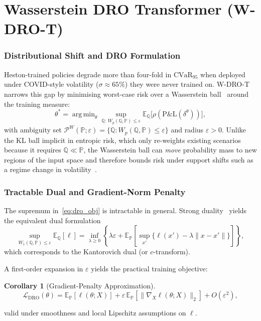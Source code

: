 \documentclass[11pt,oneside]{report}
\newcommand{\cvar}{\mathrm{CVaR}}
\newcommand{\PP}{\mathbb{P}}
\newcommand{\QQ}{\mathbb{Q}}
\newcommand{\E}{\mathbb{E}}
\newcommand{\argmin}{\mathop{\mathrm{arg\,min}}}
\newtheorem{corollary}{Corollary}[chapter]
\begin{document}
\section{Wasserstein DRO Transformer (W-DRO-T)}
\label{sec:wdrot}

\subsubsection{Distributional Shift and DRO Formulation}

Heston-trained policies degrade more than four-fold in $\cvar_{95}$ when deployed under COVID-style volatility ($\sigma\approx65\%$) they were never trained on. W-DRO-T narrows this gap by minimising worst-case risk over a Wasserstein ball~\citep{esfahani2018data} around the training measure:
\begin{equation}
\theta^* = \argmin_\theta \sup_{\QQ:\,W_p(\QQ,\PP)\le\varepsilon}
\E_\QQ\bigl[\rho(\mathrm{P\&L}(\delta^\theta))\bigr],
\label{eq:dro_obj}
\end{equation}
with ambiguity set $\mathcal{P}^W(\PP;\varepsilon) = \{\QQ:W_p(\QQ,\PP)\le\varepsilon\}$ and radius $\varepsilon>0$. Unlike the KL ball implicit in entropic risk, which only re-weights existing scenarios because it requires $\QQ\ll\PP$, the Wasserstein ball can \emph{move} probability mass to new regions of the input space and therefore bounds risk under support shifts such as a regime change in volatility~\citep{esfahani2018data}.

\subsubsection{Tractable Dual and Gradient-Norm Penalty}

The supremum in~\eqref{eq:dro_obj} is intractable in general. Strong duality~\citep{esfahani2018data,blanchet2019quantifying} yields the equivalent dual formulation
\begin{equation}
\sup_{W_1(\QQ,\PP)\le\varepsilon} \E_\QQ[\ell]
=
\inf_{\lambda\ge0}
\left\{
\lambda\varepsilon + \E_\PP\!\left[
\sup_{x'}\{\ell(x') - \lambda\|x-x'\|\}
\right]
\right\},
\end{equation}
which corresponds to the Kantorovich dual (or $c$-transform).

A first-order expansion in $\varepsilon$ yields the practical training objective:
\begin{corollary}[Gradient-Penalty Approximation]
\label{cor:grad_penalty}
\begin{equation}
\mathcal{L}_{\mathrm{DRO}}(\theta)
=
\E_\PP[\ell(\theta;X)]
+
\varepsilon\,\E_\PP[\|\nabla_X \ell(\theta;X)\|_2]
+
O(\varepsilon^2),
\label{eq:dro_loss}
\end{equation}
\end{corollary}
valid under smoothness and local Lipschitz assumptions on $\ell$.
\end{document}
